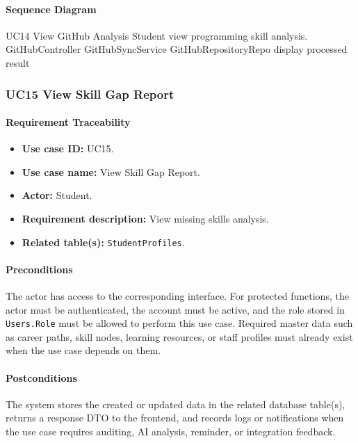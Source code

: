 \paragraph{Sequence Diagram}

\SequenceDiagram
{UC14 View GitHub Analysis}
{Student}
{view programming skill analysis.}
{GitHubController}
{GitHubSyncService}
{GitHubRepositoryRepo}
{display processed result}

\subsubsection{UC15 View Skill Gap Report}

\paragraph{Requirement Traceability}

\begin{itemize}
    \item \textbf{Use case ID:} UC15.
    \item \textbf{Use case name:} View Skill Gap Report.
    \item \textbf{Actor:} Student.
    \item \textbf{Requirement description:} View missing skills analysis.
    \item \textbf{Related table(s):} \texttt{StudentProfiles}.
\end{itemize}

\paragraph{Preconditions}

The actor has access to the corresponding interface. For protected functions, the actor must be authenticated, the account must be active, and the role stored in \texttt{Users.Role} must be allowed to perform this use case. Required master data such as career paths, skill nodes, learning resources, or staff profiles must already exist when the use case depends on them.

\paragraph{Postconditions}

The system stores the created or updated data in the related database table(s), returns a response DTO to the frontend, and records logs or notifications when the use case requires auditing, AI analysis, reminder, or integration feedback.

